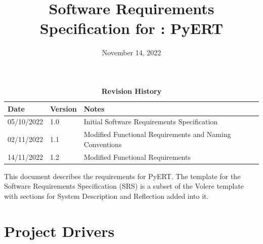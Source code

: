 \documentclass[12pt, titlepage]{article}
\begin{document}
\title{Software Requirements Specification for \progname: PyERT} 
\author{\authname}
\date{November 14, 2022}
	
\maketitle

\tableofcontents
\listoftables
\listoffigures

\begin{table}[H]
\caption{\bf Revision History}
\begin{tabularx}{\textwidth}{p{3cm}p{2cm}X}
\toprule {\bf Date} & {\bf Version} & {\bf Notes}\\
\midrule
05/10/2022 & 1.0 & Initial Software Requirements Specification\\
02/11/2022 & 1.1 & Modified Functional Requirements and Naming Conventions\\
14/11/2022 & 1.2 & Modified Functional Requirements\\
\bottomrule
\end{tabularx}
\end{table}

\newpage


This document describes the requirements for PyERT. The template for the Software Requirements Specification (SRS) is a subset of the Volere template~\citep{RobertsonAndRobertson2012} with sections for System Description and Reflection added into it.

\section{Project Drivers}
\end{document}
